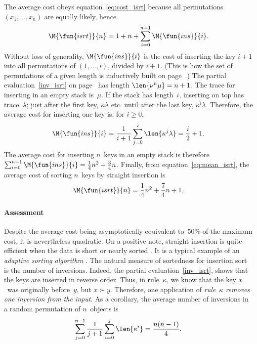 The average cost obeys equation~\eqref{eq:cost_isrt} because all
permutations \((x_1,\dots,x_n)\) are equally likely, hence
\begin{equation}
\M{\fun{isrt}}{n} = 1 + n + \sum_{i=0}^{n-1}\M{\fun{ins}}{i}.
\label{eq:mean_isrt}
\end{equation}
Without loss of generality,
\(\M{\fun{ins}}{i}\) is the cost of
inserting the key \(i+1\) into all permutations of \((1,\dots,i)\),
divided by \(i+1\). (This is how the set of
permutations of a given length is inductively built
on page~\pageref{par:permutations}.)  The partial
evaluation~\eqref{inv_isrt} on page~\pageref{inv_isrt} has
length \(\len{\nu^n\mu}=n+1\). The trace for inserting in an empty
stack is~\(\mu\). If the stack has length~\(i\), inserting on top has
trace~\(\lambda\); just after the first key, \(\kappa\lambda\)
etc. until after the last key, \(\kappa^i\lambda\). Therefore, the
average cost for inserting one key is, for \(i \geqslant 0\),
\begin{equation}
\M{\fun{ins}}{i} = \frac{1}{i+1}\sum_{j=0}^{i}\len{\kappa^j\lambda}
                 = \frac{i}{2}+1.
\label{eq:ins}
\end{equation}
The average cost for inserting \(n\)~keys in an empty stack is
therefore \(\sum_{i=0}^{n-1}\M{\fun{ins}}{i} = \frac{1}{4}n^2 +
\frac{3}{4}n\). Finally, from equation~\eqref{eq:mean_isrt}, the
average cost of sorting \(n\)~keys by straight insertion is
\begin{equation*}
\M{\fun{isrt}}{n} = \frac{1}{4}n^2 + \frac{7}{4}n + 1.
\end{equation*}

\paragraph{Assessment}

Despite the average cost being asymptotically equivalent to~\(50\%\)
of the maximum cost, it is nevertheless quadratic. On a positive note,
straight insertion is quite efficient when the data is short or nearly
sorted \citep{CookKim_1980}. It is a typical example of an
\emph{adaptive sorting algorithm}
\citep{EstivillWood_1992,MoffatPetersson_1992}. The natural measure of sortedness for insertion sort
is the number of inversions. Indeed, the partial
evaluation~\eqref{inv_isrt},  shows that the keys
are inserted in reverse order. Thus, in rule~\(\kappa\), we know that
the key \(x\)~was originally before~\(y\), but \(x \succ
y\). Therefore, one application of \emph{rule~\(\kappa\) removes one
  inversion from the input.} As a corollary, the average number of
inversions in a random permutation of \(n\)~objects is
\begin{equation*}
\belowdisplayskip=-4pt
\sum_{j=0}^{n-1}\frac{1}{j+1}\sum_{i=0}^{j}\len{\kappa^i} =
\frac{n(n-1)}{4}.
\end{equation*}

